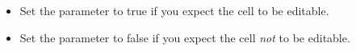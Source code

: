 
\begin{itemize}
\item Set the parameter to true if you expect the cell to be editable.
\item Set the parameter to false if you expect the cell \emph{not} to be editable.
\end{itemize}
